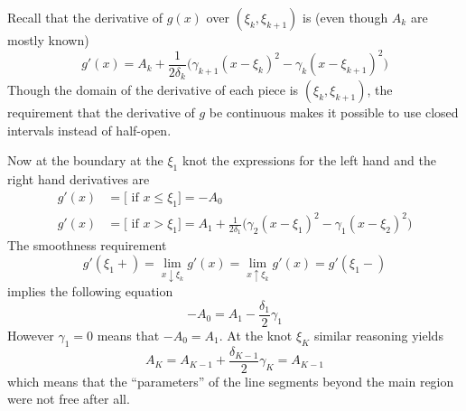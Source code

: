 \documentclass[a4paper]{article}
\begin{document}
Recall that the derivative of $g(x)$ over $(\xi_k, \xi_{k+1})$ is (even though $A_k$
are mostly known)
\[g'(x) = A_k + \frac{1}{2\delta_k}\bigl(\gamma_{k+1}(x-\xi_k)^2-\gamma_k(x-\xi_{k+1})^2\bigr)\]
Though the domain of the derivative of each piece is $(\xi_k, \xi_{k+1})$,
the requirement that the derivative of $g$ be continuous makes it possible to use
closed intervals instead of half-open.

Now at the boundary at the $\xi_1$ knot the expressions for the left hand and the
right hand derivatives are
\begin{align*}
	g'(x) &= \bigl[ \text{ if } x \leq \xi_1 \bigr]
		= - A_0\\
	g'(x) &= \bigl[ \text{ if } x > \xi_1 \bigr]
		= A_1 + \frac{1}{2\delta_1}\bigl(\gamma_2(x-\xi_1)^2-\gamma_1(x-\xi_2)^2\bigr)
\end{align*}
The smoothness requirement
\[g'(\xi_1+) = \lim_{x\downarrow \xi_k} g'(x) = \lim_{x\uparrow \xi_k} g'(x) = g'(\xi_1-)\]
implies the following equation
\[- A_0 = A_1 - \frac{\delta_1}{2}\gamma_1\]
However $\gamma_1 = 0$ means that $- A_0 = A_1$. At the knot $\xi_K$ similar reasoning
yields
\[
A_K
= A_{K-1} + \frac{\delta_{K-1}}{2}\gamma_K
= A_{K-1}
\]
which means that the ``parameters'' of the line segments beyond the main region
were not free after all.
\end{document}
